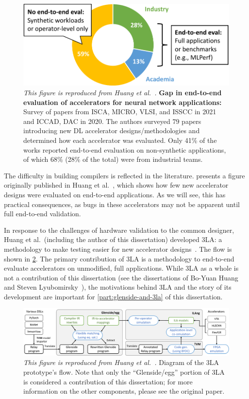 \begin{figure}
\centering
\includegraphics[width=.6\textwidth]{assets/3la-pie.pdf}
\caption{
\textit{This figure is reproduced
  from Huang et al.~\cite{huang2024application}.}
\textbf{Gap in end-to-end evaluation of accelerators for neural network applications:} 
Survey of papers from ISCA, MICRO, VLSI, and ISSCC in 2021 and ICCAD, DAC in 2020.
The authors surveyed $79$ papers introducing new DL accelerator designs/methodologies and determined how each accelerator was evaluated. Only 41\% of the works reported end-to-end evaluation on non-synthetic applications, of which 68\% (28\% of the total) were from industrial teams.
}
\label{fig:3la-pie}
\end{figure}


The difficulty in building compilers
  is reflected in the literature.
 presents a figure
  originally published in
  Huang et al.~\cite{huang2024application},
  which shows how few
  new accelerator designs
  were evaluated on end-to-end applications.
As we will see,
  this has practical consequences,
  as bugs in these accelerators
  may not be apparent
  until full end-to-end
  validation.

In response to the challenges
  of hardware validation
  to the common designer,
  Huang et al.~(including
    the author of this dissertation)
  developed
  3LA:
  a methodology
  to make testing
  easier for new accelerator designs~\cite{huang2022specialized,huang2024application}.
The \TLA flow
  is shown in 
  \cref{fig:3la-diagram}.
The primary contribution of 3LA
  is 
  a methodology to end-to-end evaluate accelerators on unmodified, full applications.
While 3LA as a whole
  is not a contribution of this dissertation
  (see the dissertations of Bo-Yuan Huang~\cite{huang2022specialized}
    and Steven Lyubomirsky~\cite{lyubomirsky2022compiler}),
  the motivations behind 3LA 
  and the story of its development
  are important for \cref{part:glenside-and-3la}
  of this dissertation.

\begin{figure}
    \centering
    \includegraphics[width=\textwidth]{assets/3la-diagram.pdf}
    \caption{
\textit{This figure is reproduced from
  Huang et al.~\cite{huang2024application}.}
Diagram of the 3LA prototype's flow.
Note that only the ``Glenside/egg''
  portion of 3LA
  is considered a contribution
  of this dissertation;
  for more information on the other components,
  please see the original paper.
}
    \label{fig:3la-diagram}
\end{figure}

